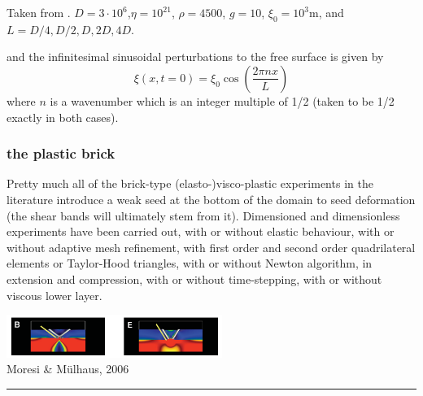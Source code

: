\begin{center}
\begin{minipage}{0.45\textwidth}
{\captionfont Taken from \cite{krwd12}. $D=3\cdot 10^6$,$\eta=10^{21}$, $\rho=4500$, $g=10$, $\xi_0=10^3$m, and 
$L=D/4,D/2,D,2D,4D$.}
\end{minipage}
\end{center}
and the infinitesimal sinusoidal perturbations to the free surface is given by
\[
\xi(x,t=0)=\xi_0 \cos \left( \frac{2 \pi n x}{L}  \right)
\]
where $n$ is a wavenumber which is an integer multiple of 1/2 (taken to be 1/2 exactly in both cases).


\subsubsection{the plastic brick}

\Literature \cite{hans03,moml07,lemm08,kaus10,egat10,qurj09,mishin11,maie12,spmw16,gltf18,frbt19,aspectmanual}

Pretty much all of the brick-type (elasto-)visco-plastic experiments in the literature
introduce a weak seed at the bottom of the domain to seed deformation (the shear bands
will ultimately stem from it). 
Dimensioned and dimensionless experiments have been carried out, with or without 
elastic behaviour, with or without adaptive mesh refinement, with first order and 
second order quadrilateral elements or Taylor-Hood triangles, with or without 
Newton algorithm, in extension and compression, with or without time-stepping,
with or without viscous lower layer. 


\begin{center}
\includegraphics[width=7cm]{images/benchmark_brick/momu06}\\
{\captionfont Moresi \& M{\"u}lhaus, 2006 \cite{momu06}}
\end{center}

\begin{center}\noindent\rule{8cm}{0.4pt}\end{center}

